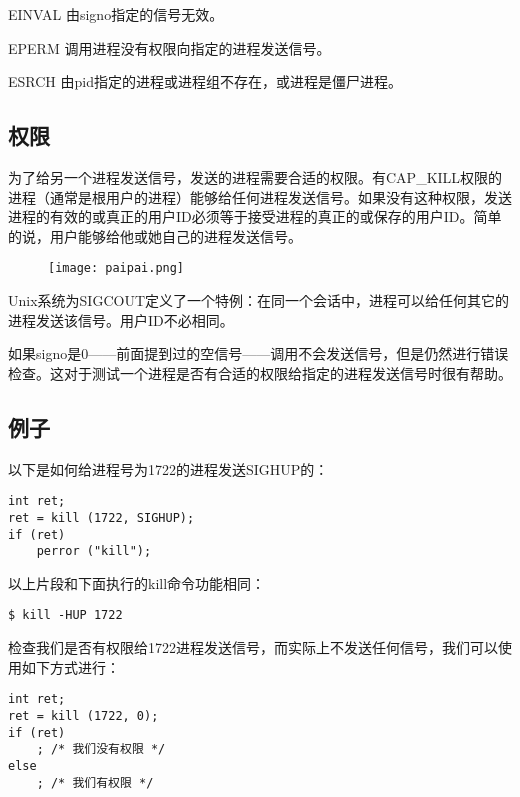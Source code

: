\begin{eqlist*}
\item[EINVAL] 由signo指定的信号无效。
\item[EPERM] 调用进程没有权限向指定的进程发送信号。
\item[ESRCH] 由pid指定的进程或进程组不存在，或进程是僵尸进程。
\end{eqlist*}

\subsection{权限}

为了给另一个进程发送信号，发送的进程需要合适的权限。有CAP\_KILL权限的进程（通常是根用户的进程）能够给任何进程发送信号。如果没有这种权限，发送进程的有效的或真正的用户ID必须等于接受进程的真正的或保存的用户ID。简单的说，用户能够给他或她自己的进程发送信号。

\begin{wrapfigure}{l}{2.5cm}
  \texttt{[image: paipai.png]}
\end{wrapfigure}
\mbox{}\begin{flushleft}Unix系统为SIGCOUT定义了一个特例：在同一个会话中，进程可以给任何其它的进程发送该信号。用户ID不必相同。 \end{flushleft}

如果signo是0——前面提到过的空信号——调用不会发送信号，但是仍然进行错误检查。这对于测试一个进程是否有合适的权限给指定的进程发送信号时很有帮助。

\subsection{例子}

以下是如何给进程号为1722的进程发送SIGHUP的：

\begin{lstlisting}
int ret;
ret = kill (1722, SIGHUP);
if (ret)
    perror ("kill");
\end{lstlisting}

以上片段和下面执行的kill命令功能相同：

\begin{lstlisting}
$ kill -HUP 1722
\end{lstlisting}

检查我们是否有权限给1722进程发送信号，而实际上不发送任何信号，我们可以使用如下方式进行：

\begin{lstlisting}
int ret;
ret = kill (1722, 0);
if (ret)
    ; /* 我们没有权限 */
else
    ; /* 我们有权限 */
\end{lstlisting}

